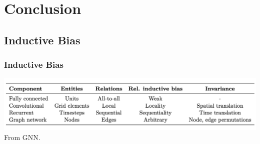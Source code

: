 \documentclass[]{beamer}
\begin{document}
\section{Conclusion}
\subsection{Inductive Bias}
\begin{frame}
    \frametitle{Inductive Bias}
    \includegraphics[scale = 0.25]{inductive-bias.png}
    From GNN\@.
\end{frame}
\end{document}

